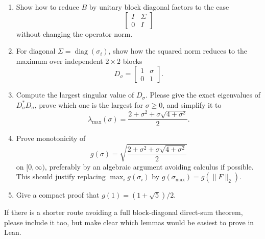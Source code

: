 \documentclass{article}
\begin{document}
\begin{enumerate}
\item Show how to reduce \(B\) by unitary block diagonal factors to the case
  \[
    \begin{bmatrix} I & \Sigma\\ 0 & I\end{bmatrix}
  \]
  without changing the operator norm.
\item For diagonal \(\Sigma=\operatorname{diag}(\sigma_i)\), show how the
  squared norm reduces to the maximum over independent \(2\times2\) blocks
  \[
    D_\sigma=\begin{bmatrix}1&\sigma\\0&1\end{bmatrix}.
  \]
\item Compute the largest singular value of \(D_\sigma\).  Please give the
  exact eigenvalues of \(D_\sigma^*D_\sigma\), prove which one is the largest
  for \(\sigma\ge0\), and simplify it to
  \[
    \lambda_{\max}(\sigma)
      =\frac{2+\sigma^2+\sigma\sqrt{4+\sigma^2}}{2}.
  \]
\item Prove monotonicity of
  \[
    g(\sigma)=\sqrt{\frac{2+\sigma^2+\sigma\sqrt{4+\sigma^2}}{2}}
  \]
  on \([0,\infty)\), preferably by an algebraic argument avoiding calculus if
  possible.  This should justify replacing \(\max_i g(\sigma_i)\) by
  \(g(\sigma_{\max})=g(\|F\|_2)\).
\item Give a compact proof that \(g(1)=(1+\sqrt5)/2\).
\end{enumerate}

If there is a shorter route avoiding a full block-diagonal direct-sum theorem,
please include it too, but make clear which lemmas would be easiest to prove in
Lean.
\end{document}
